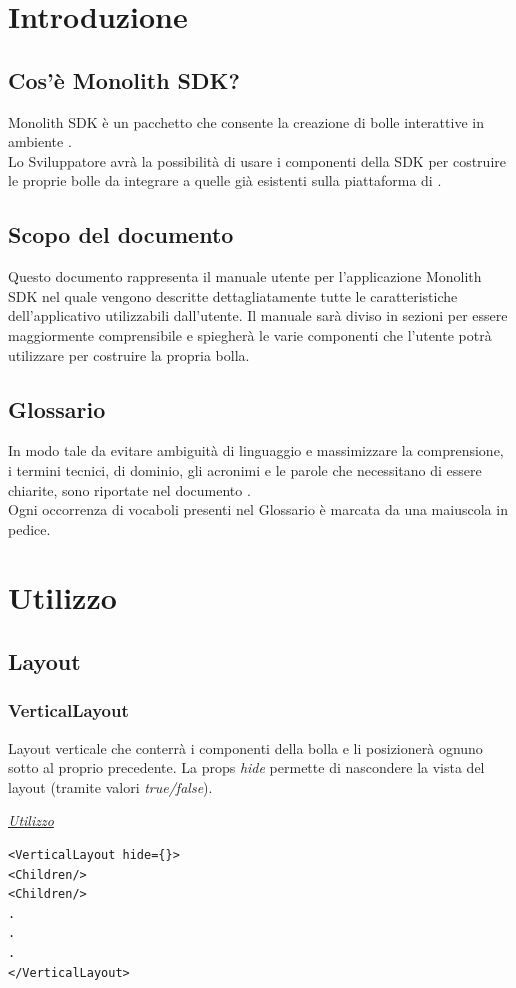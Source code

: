 \section{Introduzione}
\subsection{Cos'è Monolith SDK?}
Monolith SDK è un pacchetto  che consente la creazione di bolle interattive in ambiente .\\
Lo Sviluppatore avrà la possibilità di usare i componenti della SDK per costruire le proprie bolle da integrare a quelle già esistenti sulla piattaforma di . 
\subsection{Scopo del documento}
Questo documento rappresenta il manuale utente per l'applicazione Monolith SDK nel quale vengono descritte dettagliatamente tutte le caratteristiche dell'applicativo utilizzabili dall'utente.
Il manuale sarà diviso in sezioni per essere maggiormente comprensibile e spiegherà le varie componenti che l'utente potrà utilizzare per costruire la propria bolla.
\subsection{Glossario}
In modo tale da evitare ambiguità di linguaggio e massimizzare la comprensione, i termini tecnici, di dominio, gli acronimi e le parole che necessitano di essere chiarite, sono riportate nel documento \gloss .\\
Ogni occorrenza di vocaboli presenti nel Glossario è marcata da una \glossario{} maiuscola in pedice.

\section{Utilizzo}

\subsection{Layout}
\subsubsection{VerticalLayout}
Layout verticale che conterrà i componenti della bolla e li posizionerà ognuno sotto al proprio precedente. La props \textit{hide} permette di nascondere la vista del layout (tramite valori \textit{true/false}).
\begin{center}
\underline{\textit{Utilizzo}}
\begin{lstlisting}
<VerticalLayout hide={}>
<Children/>
<Children/>
.
.
.
</VerticalLayout>
\end{lstlisting}
\end{center}
\newpage

